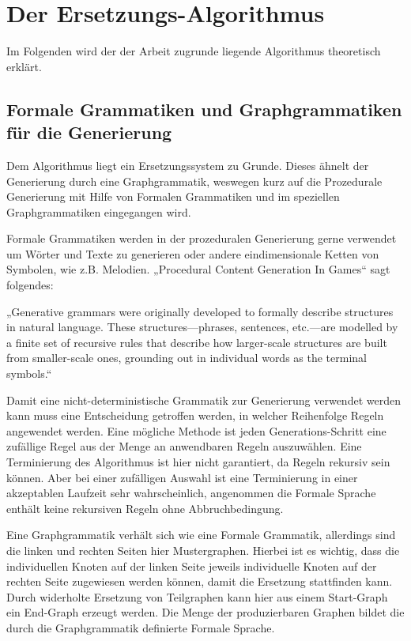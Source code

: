 \chapter{Der Ersetzungs-Algorithmus}

Im Folgenden wird der der Arbeit zugrunde liegende Algorithmus theoretisch erklärt.

\section{Formale Grammatiken und Graphgrammatiken für die Generierung}

Dem Algorithmus liegt ein Ersetzungssystem zu Grunde. Dieses ähnelt der Generierung durch eine Graphgrammatik, weswegen kurz auf die Prozedurale Generierung mit Hilfe von Formalen Grammatiken und im speziellen Graphgrammatiken eingegangen wird.

Formale Grammatiken werden in der prozeduralen Generierung gerne verwendet um Wörter und Texte zu generieren oder andere eindimensionale Ketten von Symbolen, wie z.B. Melodien. „Procedural Content Generation In Games“ sagt folgendes:

„Generative grammars were originally developed to formally describe structures in natural language. These structures—phrases, sentences, etc.—are modelled by a finite set of recursive rules that describe how larger-scale structures are built from smaller-scale ones, grounding out in individual words as the terminal symbols.“
\cite[Kap.~3.5, S.~45]{shaker2016procedural}

Damit eine nicht-deterministische Grammatik zur Generierung verwendet werden kann muss eine Entscheidung getroffen werden, in welcher Reihenfolge Regeln angewendet werden. Eine mögliche Methode ist jeden Generations-Schritt eine zufällige Regel aus der Menge an anwendbaren Regeln auszuwählen. 
\cite[Kap.~5.2, S.~75]{shaker2016procedural}
Eine Terminierung des Algorithmus ist hier nicht garantiert, da Regeln rekursiv sein können. Aber bei einer zufälligen Auswahl ist eine Terminierung in einer akzeptablen Laufzeit sehr wahrscheinlich, angenommen die Formale Sprache enthält keine rekursiven Regeln ohne Abbruchbedingung. 

Eine Graphgrammatik verhält sich wie eine Formale Grammatik, allerdings sind die linken und rechten Seiten hier Mustergraphen. Hierbei ist es wichtig, dass die individuellen Knoten auf der linken Seite jeweils individuelle Knoten auf der rechten Seite zugewiesen werden können, damit die Ersetzung stattfinden kann. 
\cite[Kap.~5.5.1, S.~80]{shaker2016procedural}
Durch widerholte Ersetzung von Teilgraphen kann hier aus einem Start-Graph ein End-Graph erzeugt werden. Die Menge der produzierbaren Graphen bildet die durch die Graphgrammatik definierte Formale Sprache. 

